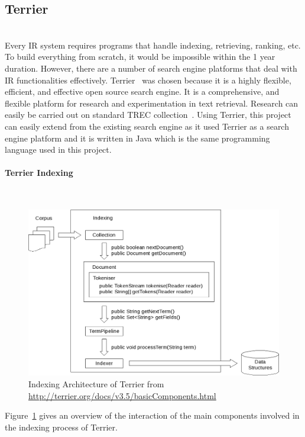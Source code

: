 \subsection{Terrier}\label{section:terrier} \hspace{0pt} \\
Every IR system requires programs that handle indexing, retrieving, ranking, etc. To build everything from scratch, it would be impossible within
the 1 year duration. However, there are a number of search engine platforms that deal with IR functionalities effectively.
Terrier~\cite{terrier} was chosen because it is a highly flexible, efficient, and effective open source search engine.
It is a comprehensive, and flexible platform for research and experimentation in text retrieval. Research can easily be 
carried out on standard TREC collection~\cite{trec}. 
Using Terrier, this project can easily extend from the existing search engine as it used Terrier as a search engine platform and it is written in Java
which is the same programming language used in this project.

\paragraph{Terrier Indexing} \hspace{0pt} \\
\begin{figure}
\centering
\includegraphics[scale=0.4]{./figures/terrierindexing.png}
\caption{Indexing Architecture of Terrier from \protect\url{http://terrier.org/docs/v3.5/basicComponents.html}} \label{fig:terrierindexing} 
\end{figure}

Figure~\ref{fig:terrierindexing} gives an overview of the interaction of the main components involved in the indexing process of Terrier.

